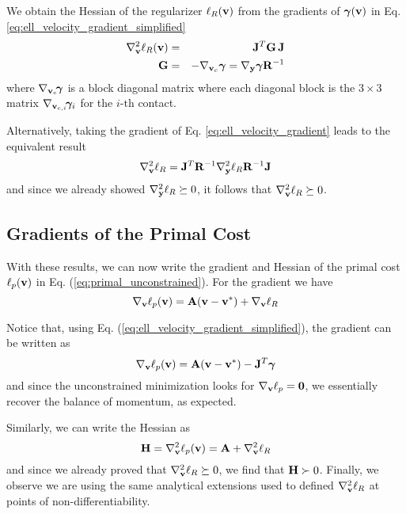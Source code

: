 We obtain the Hessian of the regularizer $\ell_R({\mathbf{v}})$ from the
gradients of ${\bm\gamma}({\mathbf{v}})$ in Eq. \eqref{eq:ell_velocity_gradient_simplified}
\begin{eqnarray}
	\nabla_\mf{v}^2\ell_R(\mf{v}) &=& \mf{J}^T\mf{G}\,\mf{J}\nonumber\\
	\mf{G} &=&-\nabla_{\mf{v}_c}\bgamma = \nabla_\mf{y}\bgamma \mf{R}^{-1}
	\label{eq:ellR_hessian}
\end{eqnarray}
where $\nabla_{{\mathbf{v}}_c}\!{\bm\gamma}$ is a block diagonal matrix where each
diagonal block is the $3\times 3$ matrix $\nabla_{{\mathbf{v}}_{c,i}}\!{\bm\gamma}_i$
for the $i\text{-th}$ contact.

Alternatively, taking the gradient of Eq. \eqref{eq:ell_velocity_gradient} leads to the equivalent result
\begin{equation}
	\nabla_\mf{v}^2\ell_R = \mf{J}^T\mf{R}^{-1}\nabla_\mf{y}^2\ell_R\mf{R}^{-1}\mf{J}
	\label{eq:ell_velocity_hessian}
\end{equation}
and since we already showed $\nabla_{\mathbf{y}}^2\ell_R\succeq 0$, it follows that
$\nabla_{\mathbf{v}}^2\ell_R\succeq 0$.


\subsection{Gradients of the Primal Cost}
With these results, we can now write the gradient and Hessian of the primal cost
$\ell_p({\mathbf{v}})$ in Eq. (\ref{eq:primal_unconstrained}). For the gradient we
have
\begin{equation}
	\nabla_{\mathbf{v}}\ell_p({\mathbf{v}}) = {\mathbf{A}}({\mathbf{v}}-{\mathbf{v}}^*) + \nabla_{\mathbf{v}}\ell_R
\end{equation}

Notice that, using Eq. (\ref{eq:ell_velocity_gradient_simplified}), the gradient
can be written as
\begin{equation}
	\nabla_{\mathbf{v}}\ell_p({\mathbf{v}}) = {\mathbf{A}}({\mathbf{v}}-{\mathbf{v}}^*) - {\mathbf{J}}^T{\bm\gamma}
\end{equation}
and since the unconstrained minimization looks for $\nabla_{\mathbf{v}}\ell_p={\mathbf{0}}$,
we essentially recover the balance of momentum, as expected.

Similarly, we can write the Hessian as
\begin{equation}
	{\mathbf{H}} = \nabla_{\mathbf{v}}^2\ell_p({\mathbf{v}}) = {\mathbf{A}} + \nabla_{\mathbf{v}}^2\ell_R
\end{equation}
and since we already proved that $\nabla_{\mathbf{v}}^2\ell_R\succeq 0$, we find that
 ${\mathbf{H}}\succ 0$. Finally, we observe we are using the same analytical
 extensions used to defined $\nabla_{\mathbf{v}}^2\ell_R$ at points of
 non-differentiability.
